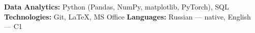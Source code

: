 \vspace{-2mm}


\begin{cvparagraph}
\textbf{Data Analytics:} Python (Pandas, NumPy, matplotlib, PyTorch), SQL \quad
\textbf{Technologies:} Git, \LaTeX, MS Office \quad
\textbf{Languages:} Russian --- native, English --- C1
\end{cvparagraph}

